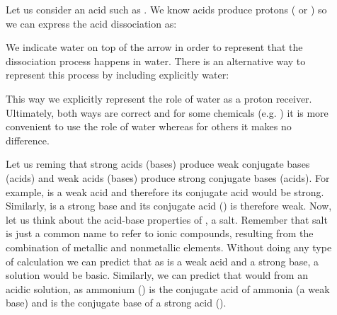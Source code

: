 \documentclass[main.tex]{subfiles}
\begin{document}
\begin{description}
\item[] Let us consider an acid such as . We know acids produce protons ( or ) so we can express the acid dissociation as:
\begin{center}\end{center}
We indicate water on top of the arrow in order to represent that the dissociation process happens in water. There is an alternative way to represent this process by including explicitly water:
\begin{center}\end{center}
This way we explicitly represent the role of water as a proton receiver. Ultimately, both ways are correct and for some chemicals (e.g. ) it is more convenient to use the role of water whereas for others it makes no difference.
\item[] Let us reming that strong acids (bases) produce weak conjugate bases (acids) and weak acids (bases) produce strong conjugate bases (acids). For example,  is a weak acid and therefore its conjugate  acid would be strong. Similarly,  is a strong base and its conjugate acid () is therefore weak. Now, let us think about the acid-base properties of , a salt. Remember that salt is just a common name to refer to ionic compounds, resulting from the combination of metallic and nonmetallic elements. Without doing any type of calculation we can predict that as  is a weak acid and  a strong base, a  solution would be basic. Similarly, we can predict that  would from an acidic solution, as ammonium () is the conjugate acid of ammonia (a weak base) and  is the conjugate base of a strong acid ().







\end{description}
\end{document}
